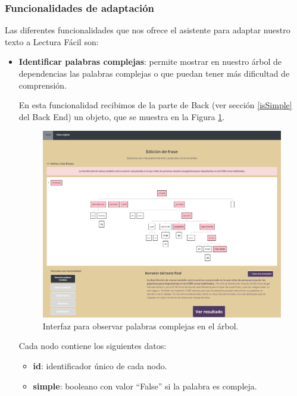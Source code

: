 	\subsubsection{Funcionalidades de adaptación}






Las diferentes funcionalidades que nos ofrece el asistente para adaptar nuestro texto a Lectura Fácil son:

\begin{itemize}
	\item \textbf{Identificar palabras complejas}: permite mostrar en nuestro árbol de dependencias las palabras complejas o que puedan tener más dificultad de comprensión. 
	
	En esta funcionalidad recibimos de la parte de Back (ver sección \ref{isSimple} del Back End) un objeto, que se muestra en la Figura \ref{fig:InterfazActivarPalabrasComplejas}.
		 \begin{figure}[h!]
			\centering
			\includegraphics[scale=0.6]{Imagenes/Figuras/ActivarPalabrasComplejas}
			
			\caption{Interfaz para observar palabras complejas en el árbol.}
			\label{fig:InterfazActivarPalabrasComplejas}
		\end{figure}
		Cada nodo contiene los siguientes datos:
		
	\begin{itemize}
		\item \textbf{id}: identificador único de cada nodo.
		\item \textbf{simple}: booleano con valor ``False'' si la palabra es compleja.
  



\end{itemize}
\end{itemize}
